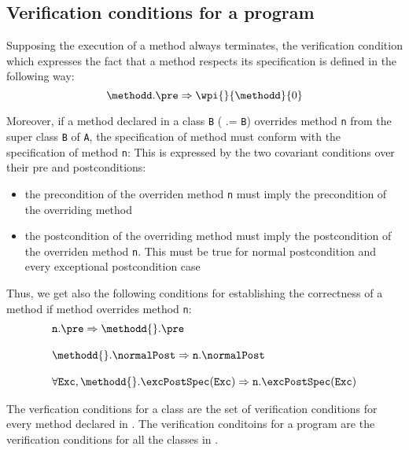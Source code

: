 

\subsection{Verification conditions for a program} \label{wp:vcMeth}
Supposing the execution of a method always terminates, the verification condition which expresses the fact that 
 a method \methodd  respects its specification %
is defined in the following way:
$$ \methodd.\pre \Rightarrow \wpi{}{\methodd}{0}$$

Moreover, if a method \methodd{} declared in a class \texttt{B} ( \methodd.\declaredIn = \texttt{B}) overrides  method \mbox{\rm\texttt{n}} from the super
 class \texttt{B} of \texttt{A}, the specification of method \methodd{} must conform with the specification of method   \mbox{\rm\texttt{n}}:
  This is expressed by the two covariant conditions over their pre and postconditions:
	\begin{itemize}
	   \item the precondition of the  overriden method \mbox{\rm\texttt{n}} must  imply
	         the precondition of the overriding method  \methodd{}
	   \item the postcondition of the overriding method  \methodd{}  must imply 
	         the postcondition of the overriden method \mbox{\rm\texttt{n}}. This  must be true for normal postcondition and
		 every  exceptional postcondition case
	\end{itemize}


Thus, we get also the following conditions for establishing the correctness of a method \methodd{} if method \methodd{}  overrides method \mbox{\rm\texttt{n}}:
$$
  \begin{array}{l}
         \mbox{\rm\texttt{n}} . \pre \Rightarrow \methodd{}.\pre\\\\
	 \methodd{}.\normalPost \Rightarrow \mbox{\rm\texttt{n}} .\normalPost\\\\
	  \forall \mbox{\rm\texttt{Exc}} , \methodd{}.\excPostSpec(\mbox{\rm\texttt{Exc}}  )    \Rightarrow \mbox{\rm\texttt{n}}.\excPostSpec(\mbox{\rm\texttt{Exc}}  )
   \end{array}
$$

The verfication conditions for a class \class{} are the set of verification conditions for every method declared in \class.
The verification conditoins  for a program \Program{} are the verification conditions for all the classes in \Program{}.
